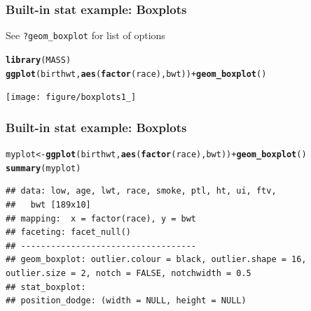 \documentclass{beamer}\usepackage[]{graphicx}\usepackage[]{color}
\makeatletter
\newcommand{\hlkwd}[1]{\textcolor[rgb]{0.737,0.353,0.396}{\textbf{#1}}}%
\newenvironment{kframe}{%
 \def\at@end@of@kframe{}%
 \ifinner\ifhmode%
  \def\at@end@of@kframe{\end{minipage}}%
  \begin{minipage}{\columnwidth}%
 \fi\fi%
 \def\FrameCommand##1{\hskip\@totalleftmargin \hskip-\fboxsep
 \colorbox{shadecolor}{##1}\hskip-\fboxsep
     \hskip-\linewidth \hskip-\@totalleftmargin \hskip\columnwidth}%
 \MakeFramed {\advance\hsize-\width
   \@totalleftmargin\z@ \linewidth\hsize
   \@setminipage}}%
 {\par\unskip\endMakeFramed%
 \at@end@of@kframe}
\newenvironment{knitrout}{}{} %
\makeatother
\begin{document}

\begin{frame}[fragile]
\frametitle{Built-in stat example: Boxplots}
See \texttt{?geom\_boxplot} for list of options
\begin{knitrout}\footnotesize
{}\color{fgcolor}\begin{kframe}
\begin{alltt}
\hlkwd{library}(MASS)
\hlkwd{ggplot}(birthwt, \hlkwd{aes}(\hlkwd{factor}(race), bwt)) + \hlkwd{geom_boxplot}()
\end{alltt}
\end{kframe}

{\centering \texttt{[image: figure/boxplots1\_]} 

}



\end{knitrout}

\end{frame}


\begin{frame}[fragile]
\frametitle{Built-in stat example: Boxplots}
\begin{knitrout}\footnotesize
{}\color{fgcolor}\begin{kframe}
\begin{alltt}
myplot <- \hlkwd{ggplot}(birthwt, \hlkwd{aes}(\hlkwd{factor}(race), bwt)) + \hlkwd{geom_boxplot}()
\hlkwd{summary}(myplot)
\end{alltt}
\begin{verbatim}
## data: low, age, lwt, race, smoke, ptl, ht, ui, ftv,
##   bwt [189x10]
## mapping:  x = factor(race), y = bwt
## faceting: facet_null() 
## -----------------------------------
## geom_boxplot: outlier.colour = black, outlier.shape = 16, outlier.size = 2, notch = FALSE, notchwidth = 0.5 
## stat_boxplot:  
## position_dodge: (width = NULL, height = NULL)
\end{verbatim}
\end{kframe}
\end{knitrout}

\end{frame}

\end{document}
